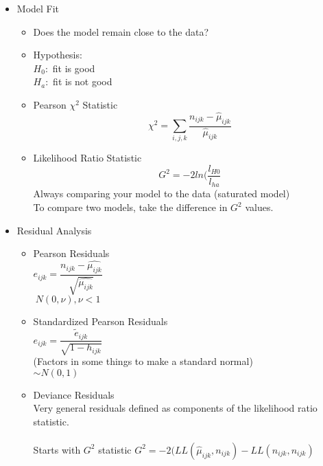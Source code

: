 \documentclass[12 pt]{article}
\begin{document}
\begin{enumerate}
        \begin{itemize}
            \item Model Fit
                \begin{itemize}
                    \item Does the model remain close to the data?
                    \item Hypothesis: \\
                    $ H_0:$ fit is good\\
                    $ H_a:$ fit is not good
                    \item Pearson \( \chi^2 \) Statistic\\
                             $$ \chi^2 = \sum_{i,j,k} \dfrac{n_{ijk}-\hat{\mu}_{ijk}}{\hat{\mu}_{ijk}} $$
                    \item Likelihood Ratio Statistic \\
                    $$ G^2 = -2ln\big(\frac{l_{H0}}{l_{ha}} $$
                    Always comparing your model to the data (saturated model)\\
                    To compare two models, take the difference in \( G^2 \) values.
                \end{itemize}
            \item Residual Analysis
                \begin{itemize}
                    \item Pearson Residuals\\
                    $ e_{ijk} = \dfrac{n_{ijk}- \hat{\mu_{ijk}}}{\sqrt{\hat{\mu_{ijk}}}} $\\
                    $ ~N(0,\nu), \nu < 1$
                    \item Standardized Pearson Residuals\\
                    $ e_{ijk} = \dfrac{\widetilde{e}_{ijk}}{\sqrt{1-h_{ijk}}} $\\
                    (Factors in some things to make a standard normal)\\
                    $ \sim N(0,1)$
                    \item Deviance Residuals \\
                    Very general residuals defined as components of the likelihood ratio statistic. \\\\
                    Starts with \(G^2\) statistic 
                    $ G^2 = -2(LL(\hat{\mu}_{ijk}, n_{ijk}) - LL(n_{ijk}, n_{ijk}) $\\

\end{itemize}
\end{itemize}
\end{enumerate}
\end{document}
